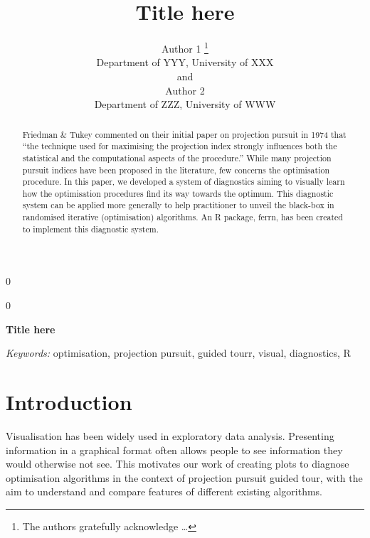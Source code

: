 \documentclass[12pt]{article}
\newcommand{\blind}{0}
\begin{document}
\def\spacingset#1{\renewcommand{\baselinestretch}%
{#1}\small\normalsize} \spacingset{1}



\blind
{
  \title{\bf Title here}

  \author{
        Author 1 \thanks{The authors gratefully acknowledge \ldots{}} \\
    Department of YYY, University of XXX\\
     and \\     Author 2 \\
    Department of ZZZ, University of WWW\\
      }
  \maketitle
} \fi

\blind
{
  \bigskip
  \bigskip
  \bigskip
  \begin{center}
    {\LARGE\bf Title here}
  \end{center}
  \medskip
} \fi

\bigskip
\begin{abstract}
Friedman \& Tukey commented on their initial paper on projection pursuit
in 1974 that ``the technique used for maximising the projection index
strongly influences both the statistical and the computational aspects
of the procedure.'' While many projection pursuit indices have been
proposed in the literature, few concerns the optimisation procedure. In
this paper, we developed a system of diagnostics aiming to visually
learn how the optimisation procedures find its way towards the optimum.
This diagnostic system can be applied more generally to help
practitioner to unveil the black-box in randomised iterative
(optimisation) algorithms. An R package, ferrn, has been created to
implement this diagnostic system.
\end{abstract}

\noindent%
{\it Keywords:} optimisation, projection pursuit, guided tourr, visual, diagnostics, R
\vfill

\newpage
\spacingset{1.45} %

\hypertarget{introduction}{%
\section{Introduction}\label{introduction}}

Visualisation has been widely used in exploratory data analysis.
Presenting information in a graphical format often allows people to see
information they would otherwise not see. This motivates our work of
creating plots to diagnose optimisation algorithms in the context of
projection pursuit guided tour, with the aim to understand and compare
features of different existing algorithms.
\end{document}
